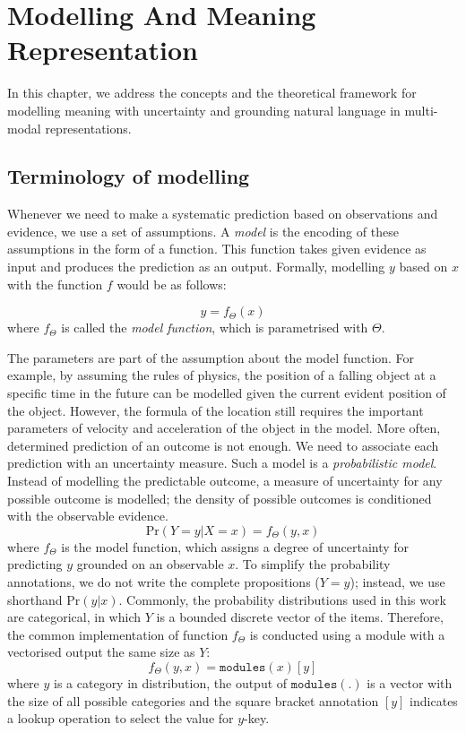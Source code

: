 \chapter{Modelling And Meaning Representation}
\label{sec:concepts}


In this chapter, we address the concepts and the theoretical framework for modelling meaning with uncertainty and grounding natural language in multi-modal representations.

\section{Terminology of modelling}
\label{sec:concepts:model}
Whenever we need to make a systematic prediction based on observations and evidence, we use a set of assumptions. 
A \emph{model} is the encoding of these assumptions in the form of a function. 
This function takes given evidence as input and produces the prediction as an output. Formally, modelling $y$ based on $x$ with the function $f$ would be as follows:

\begin{equation}
y = f_{\Theta}(x)
\end{equation}
\noindent where $f_{\Theta}$ is called the \emph{model function}, which is parametrised with $\Theta$. 

The parameters are part of the assumption about the model function. 
For example, by assuming the rules of physics, the position of a falling object at a specific time in the future can be modelled given the current evident position of the object. 
However, the formula of the location still requires the important parameters of velocity and acceleration of the object in the model. 
More often, determined prediction of an outcome is not enough. We need to associate each prediction with an uncertainty measure. 
Such a model is a \emph{probabilistic model}. 
Instead of modelling the predictable outcome, a measure of uncertainty for any possible outcome is modelled; the density of possible outcomes is conditioned with the observable evidence.
\begin{equation}\label{eq:probabilistic_model}
\mathrm{Pr}( Y=y | X=x ) = f_{\Theta}(y, x)
\end{equation}
\noindent where $f_{\Theta}$ is the model function, which assigns a degree of uncertainty for predicting $y$ grounded on an observable $x$. To simplify the probability annotations, we do not write the complete propositions ($Y=y$); instead, we use shorthand \textemdash  $\mathrm{Pr}( y | x )$.
Commonly, the probability distributions used in this work are categorical, in which $Y$ is a bounded discrete vector of the items. Therefore, the common implementation of function $f_{\Theta}$ is conducted using a module with a vectorised output the same size as $Y$:
\begin{equation}\label{eq:probabilistic_model_module}
f_{\Theta}(y, x) = \mathtt{modules}(x)[y]
\end{equation}
\noindent where $y$ is a category in distribution, the output of $\mathtt{modules}(.)$ is a vector with the size of all possible categories and the square bracket annotation $[y]$ indicates a lookup operation to select the value for $y$-key.

